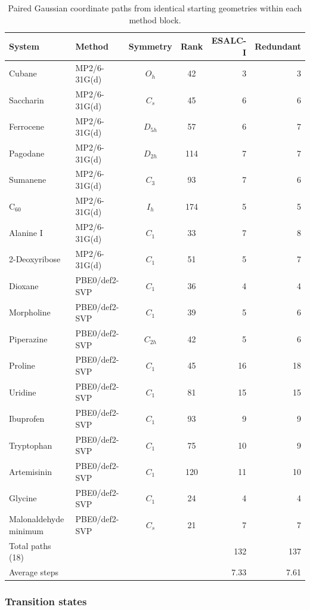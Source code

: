 \documentclass[journal=jctcce,manuscript=article,layout=traditional]{achemso}
\theoremstyle{definition}
\begin{document}
\begin{table}[htbp]
\centering
\scriptsize
\setlength{\tabcolsep}{4pt}
\caption{{Paired Gaussian coordinate paths from identical starting
geometries within each method block.}}
\label{tab:main-gaussian-coordinate-paths}
\begin{tabularx}{\linewidth}{@{}lXccrr@{}}
\toprule
System & Method & Symmetry & {Rank} & ESALC-I & Redundant \\
\midrule
Cubane & MP2/6-31G(d) & \(O_h\) & {42} & 3 & 3 \\
Saccharin & MP2/6-31G(d) & \(C_s\) & {45} & 6 & 6 \\
Ferrocene & MP2/6-31G(d) & \(D_{5h}\) & {57} & 6 & 7 \\
Pagodane & MP2/6-31G(d) & \(D_{2h}\) & {114} & 7 & 7 \\
Sumanene & MP2/6-31G(d) & \(C_3\) & {93} & 7 & 6 \\
C$_{60}$ & MP2/6-31G(d) & \(I_h\) & {174} & 5 & 5 \\
Alanine I & MP2/6-31G(d) & \(C_1\) & {33} & 7 & 8 \\
2-Deoxyribose & MP2/6-31G(d) & \(C_1\) & {51} & 5 & 7 \\
Dioxane & PBE0/def2-SVP & \(C_1\) & {36} & 4 & 4 \\
Morpholine & PBE0/def2-SVP & \(C_1\) & {39} & 5 & 6 \\
Piperazine & PBE0/def2-SVP & \(C_{2h}\) & {42} & 5 & 6 \\
Proline & PBE0/def2-SVP & \(C_1\) & {45} & 16 & 18 \\
Uridine & PBE0/def2-SVP & \(C_1\) & {81} & 15 & 15 \\
Ibuprofen & PBE0/def2-SVP & \(C_1\) & {93} & 9 & 9 \\
Tryptophan & PBE0/def2-SVP & \(C_1\) & {75} & 10 & 9 \\
Artemisinin & PBE0/def2-SVP & \(C_1\) & {120} & 11 & 10 \\
Glycine & PBE0/def2-SVP & \(C_1\) & {24} & 4 & 4 \\
Malonaldehyde minimum & PBE0/def2-SVP & \(C_s\) & {21} & 7 & 7 \\
\midrule
{Total paths (18)} &  &  &  & {132} & {137} \\
{Average steps} &  &  &  & {7.33} & {7.61} \\
\bottomrule
\end{tabularx}
\end{table}

\subsubsection{Transition states}
\label{sec:transition-states}
\begingroup
\end{document}
